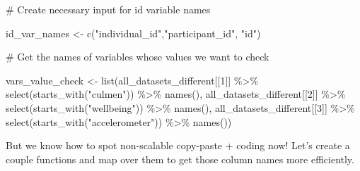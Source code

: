 \documentclass[
  letterpaper,
  DIV=11,
  numbers=noendperiod]{scrreprt}
\newenvironment{Shaded}{\begin{snugshade}}{\end{snugshade}}
\newcommand{\CommentTok}[1]{\textcolor[rgb]{0.37,0.37,0.37}{#1}}
\newcommand{\DecValTok}[1]{\textcolor[rgb]{0.68,0.00,0.00}{#1}}
\newcommand{\FunctionTok}[1]{\textcolor[rgb]{0.28,0.35,0.67}{#1}}
\newcommand{\NormalTok}[1]{\textcolor[rgb]{0.00,0.23,0.31}{#1}}
\newcommand{\OtherTok}[1]{\textcolor[rgb]{0.00,0.23,0.31}{#1}}
\newcommand{\SpecialCharTok}[1]{\textcolor[rgb]{0.37,0.37,0.37}{#1}}
\newcommand{\StringTok}[1]{\textcolor[rgb]{0.13,0.47,0.30}{#1}}
\begin{document}
\begin{Shaded}
\begin{Highlighting}[]
\CommentTok{\# Create necessary input for id variable names}

\NormalTok{id\_var\_names }\OtherTok{\textless{}{-}} \FunctionTok{c}\NormalTok{(}\StringTok{"individual\_id"}\NormalTok{,}\StringTok{"participant\_id"}\NormalTok{, }\StringTok{"id"}\NormalTok{)}

\CommentTok{\# Get the names of variables whose values we want to check}

\NormalTok{vars\_value\_check }\OtherTok{\textless{}{-}} \FunctionTok{list}\NormalTok{(all\_datasets\_different[[}\DecValTok{1}\NormalTok{]] }\SpecialCharTok{\%\textgreater{}\%} 
                          \FunctionTok{select}\NormalTok{(}\FunctionTok{starts\_with}\NormalTok{(}\StringTok{"culmen"}\NormalTok{)) }\SpecialCharTok{\%\textgreater{}\%} 
                          \FunctionTok{names}\NormalTok{(),}
\NormalTok{                      all\_datasets\_different[[}\DecValTok{2}\NormalTok{]] }\SpecialCharTok{\%\textgreater{}\%} 
                        \FunctionTok{select}\NormalTok{(}\FunctionTok{starts\_with}\NormalTok{(}\StringTok{"wellbeing"}\NormalTok{)) }\SpecialCharTok{\%\textgreater{}\%} 
                        \FunctionTok{names}\NormalTok{(),}
\NormalTok{                      all\_datasets\_different[[}\DecValTok{3}\NormalTok{]] }\SpecialCharTok{\%\textgreater{}\%} 
                        \FunctionTok{select}\NormalTok{(}\FunctionTok{starts\_with}\NormalTok{(}\StringTok{"accelerometer"}\NormalTok{)) }\SpecialCharTok{\%\textgreater{}\%} 
                        \FunctionTok{names}\NormalTok{())}
\end{Highlighting}
\end{Shaded}

But we know how to spot non-scalable copy-paste + coding now! Let's
create a couple functions and map over them to get those column names
more efficiently.
\end{document}
